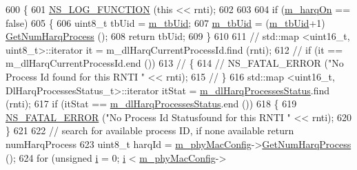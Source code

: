 \begin{DoxyCode}
600 \{
601         \hyperlink{log-macros-disabled_8h_a90b90d5bad1f39cb1b64923ea94c0761}{NS\_LOG\_FUNCTION} (\textcolor{keyword}{this} << rnti);
602 
603 
604         \textcolor{keywordflow}{if} (\hyperlink{classns3_1_1MmWaveFlexTtiMaxRateMacScheduler_a43dee0cca8dce652c2a2dc750262708e}{m\_harqOn} == \textcolor{keyword}{false})
605         \{
606                 uint8\_t tbUid = \hyperlink{classns3_1_1MmWaveFlexTtiMaxRateMacScheduler_a24a4bdb5698dbeaccb6afc572b39f691}{m\_tbUid};
607                 \hyperlink{classns3_1_1MmWaveFlexTtiMaxRateMacScheduler_a24a4bdb5698dbeaccb6afc572b39f691}{m\_tbUid} = (\hyperlink{classns3_1_1MmWaveFlexTtiMaxRateMacScheduler_a24a4bdb5698dbeaccb6afc572b39f691}{m\_tbUid}+1) %
      \hyperlink{classns3_1_1MmWavePhyMacCommon_a40773d84172ebeb5aff125f56ebcc5ac}{GetNumHarqProcess} ();
608                 \textcolor{keywordflow}{return} tbUid;
609         \}
610 
611 \textcolor{comment}{//      std::map <uint16\_t, uint8\_t>::iterator it = m\_dlHarqCurrentProcessId.find (rnti);}
612 \textcolor{comment}{//      if (it == m\_dlHarqCurrentProcessId.end ())}
613 \textcolor{comment}{//      \{}
614 \textcolor{comment}{//              NS\_FATAL\_ERROR ("No Process Id found for this RNTI " << rnti);}
615 \textcolor{comment}{//      \}}
616         std::map <uint16\_t, DlHarqProcessesStatus\_t>::iterator itStat = 
      \hyperlink{classns3_1_1MmWaveFlexTtiMaxRateMacScheduler_a3f74b4d493895851f7ee62f90584fe0c}{m\_dlHarqProcessesStatus}.find (rnti);
617         \textcolor{keywordflow}{if} (itStat == \hyperlink{classns3_1_1MmWaveFlexTtiMaxRateMacScheduler_a3f74b4d493895851f7ee62f90584fe0c}{m\_dlHarqProcessesStatus}.end ())
618         \{
619                 \hyperlink{group__fatal_ga5131d5e3f75d7d4cbfd706ac456fdc85}{NS\_FATAL\_ERROR} (\textcolor{stringliteral}{"No Process Id Statusfound for this RNTI "} << rnti);
620         \}
621 
622         \textcolor{comment}{// search for available process ID, if none available return numHarqProcess}
623         uint8\_t harqId = \hyperlink{classns3_1_1MmWaveMacScheduler_a24d7af4971d2e500fe543cefbafa2fd9}{m\_phyMacConfig}->\hyperlink{classns3_1_1MmWavePhyMacCommon_a40773d84172ebeb5aff125f56ebcc5ac}{GetNumHarqProcess} ();
624         \textcolor{keywordflow}{for} (\textcolor{keywordtype}{unsigned} \hyperlink{bernuolliDistribution_8m_a6f6ccfcf58b31cb6412107d9d5281426}{i} = 0; \hyperlink{bernuolliDistribution_8m_a6f6ccfcf58b31cb6412107d9d5281426}{i} < \hyperlink{classns3_1_1MmWaveMacScheduler_a24d7af4971d2e500fe543cefbafa2fd9}{m\_phyMacConfig}->

\end{DoxyCode}
